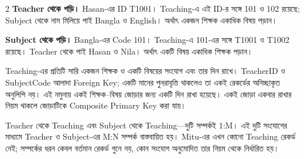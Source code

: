 \begin{multicols}{2}
\textbf{Teacher থেকে পড়ি।} Hasan-এর ID T1001। Teaching-এ এই ID-র
সঙ্গে 101 ও 102 রয়েছে; Subject থেকে নাম মিলিয়ে পাই Bangla ও English।
অর্থাৎ একজন শিক্ষক একাধিক বিষয় পড়ান।

\columnbreak
\textbf{Subject থেকে পড়ি।} Bangla-এর Code 101। Teaching-এ 101-এর
সঙ্গে T1001 ও T1002 রয়েছে। Teacher থেকে পাই Hasan ও Nila। অর্থাৎ
একটি বিষয় একাধিক শিক্ষক পড়ান।
\end{multicols}

Teaching-এর প্রতিটি সারি একজন শিক্ষক ও একটি বিষয়ের সংযোগ এবং তার দিন
রাখে। TeacherID ও SubjectCode আলাদা Foreign Key; একটি মানের পুনরাবৃত্তি
থাকলেও তা একই রেকর্ডের অনিচ্ছাকৃত অনুলিপি নয়। এই নমুনায় একই
শিক্ষক--বিষয় জোড়ার জন্য একটি দিন রাখা হয়েছে। একই জোড়া একবার রাখার
নিয়ম থাকলে জোড়াটিকে Composite Primary Key করা যায়।

Teacher থেকে Teaching এবং Subject থেকে Teaching---দুটি সম্পর্কই 1:M।
এই দুটি সংযোগের মাধ্যমে Teacher ও Subject-এর M:N সম্পর্ক বাস্তবায়িত হয়।
Mitu-এর এখন কোনো Teaching রেকর্ড নেই; সম্পর্কের ধরন কেবল বর্তমান
রেকর্ড গুনে নয়, কোন সংযোগ অনুমোদিত তার নিয়ম থেকে নির্ধারিত হয়।

